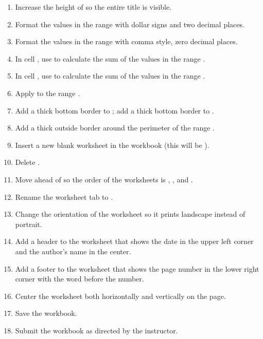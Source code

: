 \begin{enumerate}
	\item Increase the height of  so the entire title is visible.
	\item Format the values in the range  with dollar signs and two decimal places.
	\item Format the values in the range  with comma style, zero decimal places.
	\item In cell , use  to calculate the sum of the values in the range .
	\item In cell , use  to calculate the sum of the values in the range .
	\item Apply  to the range .
	\item Add a thick bottom border to ; add a thick bottom border to .
	\item Add a thick outside border around the perimeter of the range .
	\item Insert a new blank worksheet in the workbook (this will be ).
	\item Delete .
	\item Move  ahead of  so the order of the worksheets is , , and .
	\item Rename the  worksheet tab to .
	\item Change the orientation of the  worksheet so it prints landscape instead of portrait.
	\item Add a header to the  worksheet that shows the date in the upper left corner and the author's name in the center.
	\item Add a footer to the  worksheet that shows the page number in the lower right corner with the word  before the number.
	\item Center the worksheet both horizontally and vertically on the page.
	\item Save the  workbook.
	\item Submit the  workbook as directed by the instructor.

\end{enumerate}
